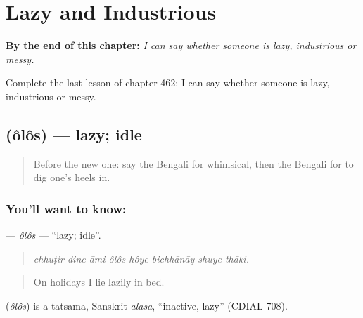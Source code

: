 
\chapter{Lazy and Industrious}
\label{ch:bn-lazy-and-industrious}

\begin{chapteropening}
\textbf{By the end of this chapter:} \emph{I can say whether someone is lazy, industrious or messy.}

Complete the last lesson of chapter 462: I can say whether someone is lazy, industrious or messy.
\end{chapteropening}

\section[\texorpdfstring{\bn{অলস} (ôlôs)}{অলস (ôlôs)}]{ (ôlôs) — lazy; idle}

\label{lesson:BN-C462-olos}



\begin{quote}
Before the new one: say the Bengali for whimsical, then the Bengali for to dig one's heels in.
\end{quote}

\subsection*{You'll want to know: }
\textbf{} — \emph{ôlôs} — \textquotedblleft{}lazy; idle\textquotedblright{}.

\begin{quote}
       
\end{quote}

\begin{quote}
\emph{chhuṭir dine āmi ôlôs hôye bichhānāy shuye thāki.}
\end{quote}

\begin{quote}
On holidays I lie lazily in bed.
\end{quote}

\begin{cousinweb}
\textbf{} (\emph{ôlôs}) is a tatsama, Sanskrit \emph{alasa}, \textquotedblleft{}inactive, lazy\textquotedblright{} (CDIAL 708).
\end{cousinweb}

